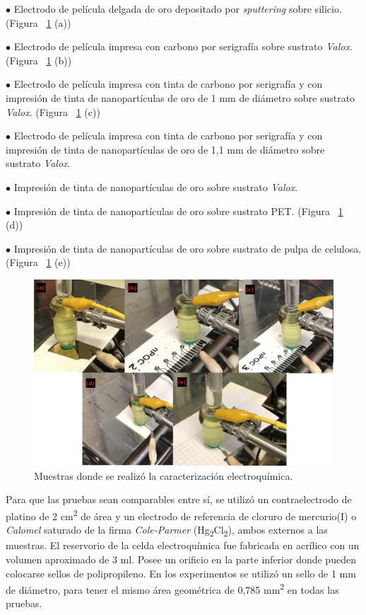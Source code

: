 $\bullet$ Electrodo de película delgada de oro depositado por \textit{sputtering} sobre silicio. (Figura ~\ref{fig:Figura_pruebas_muestras} (a))

$\bullet$ Electrodo de película impresa con carbono por serigrafía sobre sustrato \textit{Valox}. (Figura ~\ref{fig:Figura_pruebas_muestras} (b))

$\bullet$ Electrodo de película impresa con tinta de carbono por serigrafía y con impresión de tinta de nanopartículas de oro de 1 mm de diámetro sobre sustrato \textit{Valox}. (Figura ~\ref{fig:Figura_pruebas_muestras} (c))

$\bullet$ Electrodo de película impresa con tinta de carbono por serigrafía y con impresión de tinta de nanopartículas de oro de 1,1 mm de diámetro sobre sustrato \textit{Valox}.

$\bullet$ Impresión de tinta de nanopartículas de oro sobre sustrato \textit{Valox}.

$\bullet$ Impresión de tinta de nanopartículas de oro sobre sustrato PET. (Figura ~\ref{fig:Figura_pruebas_muestras} (d))

$\bullet$ Impresión de tinta de nanopartículas de oro sobre sustrato de pulpa de celulosa. (Figura ~\ref{fig:Figura_pruebas_muestras} (e))

\begin{figure}[H]
  \centering
    \includegraphics[width=1\textwidth]{Figuras/Figura_pruebas_muestras}
  \caption{Muestras donde se realizó la caracterización electroquímica.}
  \label{fig:Figura_pruebas_muestras}
\end{figure}

Para que las pruebas sean comparables entre sí, se utilizó un contraelectrodo de platino de 2 cm\textsuperscript{2} de área y un electrodo de referencia de cloruro de mercurio(I) o \textit{Calomel} saturado de la firma \textit{Cole-Parmer} (Hg\textsubscript{2}Cl\textsubscript{2}), ambos externos a las muestras. El reservorio de la celda electroquímica fue fabricada en acrílico con un volumen aproximado de 3 ml. Posee un orificio en la parte inferior donde pueden colocarse sellos de polipropileno. En los experimentos se utilizó un sello de 1 mm de diámetro, para tener el mismo área geométrica de 0,785 mm\textsuperscript{2} en todas las pruebas.

